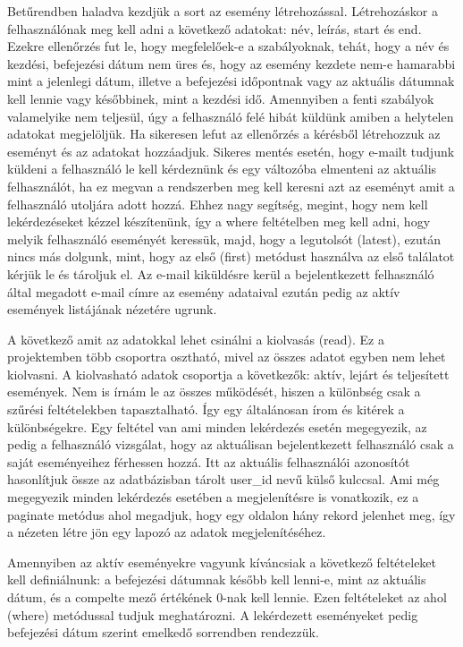 \documentclass[
]{thesis-ekf}
\theoremstyle{definition}
\theoremstyle{remark}
\begin{document}
Betűrendben haladva kezdjük a sort az esemény létrehozással. Létrehozáskor a felhasználónak meg kell adni a következő adatokat: név, leírás, start és end. Ezekre ellenőrzés fut le, hogy megfelelőek-e a szabályoknak, tehát, hogy a név és kezdési, befejezési dátum nem üres és, hogy az esemény kezdete nem-e hamarabbi mint a jelenlegi dátum, illetve a befejezési időpontnak vagy az aktuális dátumnak kell lennie vagy későbbinek, mint a kezdési idő. Amennyiben a fenti szabályok valamelyike nem teljesül, úgy a felhasználó felé hibát küldünk amiben a helytelen adatokat megjelöljük. Ha sikeresen lefut az ellenőrzés a kérésből létrehozzuk az eseményt és az adatokat hozzáadjuk. Sikeres mentés esetén, hogy e-mailt tudjunk küldeni a felhasználó le kell kérdeznünk és egy változóba elmenteni az aktuális felhasználót, ha ez megvan a rendszerben meg kell keresni azt az eseményt amit a felhasználó utoljára adott hozzá. Ehhez nagy segítség, megint, hogy nem kell lekérdezéseket kézzel készítenünk, így a where feltételben meg kell adni, hogy melyik felhasználó eseményét keressük, majd, hogy a legutolsót (latest), ezután nincs más dolgunk, mint, hogy az első (first) metódust használva az első találatot kérjük le és tároljuk el. Az e-mail kiküldésre kerül a bejelentkezett felhasználó által megadott e-mail címre az esemény adataival ezután pedig az aktív események listájának nézetére ugrunk.

A következő amit az adatokkal lehet csinálni a kiolvasás (read). Ez a projektemben több csoportra osztható, mivel az összes adatot egyben nem lehet kiolvasni. A kiolvasható adatok csoportja a következők: aktív, lejárt és teljesített események. Nem is írnám le az összes működését, hiszen a különbség csak a szűrési feltételekben tapasztalható. Így egy általánosan írom és kitérek a különbségekre. Egy feltétel van ami minden lekérdezés esetén megegyezik, az pedig a felhasználó vizsgálat, hogy az aktuálisan bejelentkezett felhasználó csak a saját eseményeihez férhessen hozzá. Itt az aktuális felhasználói azonosítót hasonlítjuk össze az adatbázisban tárolt user\_id nevű külső kulccsal. Ami még megegyezik minden lekérdezés esetében a megjelenítésre is vonatkozik, ez a paginate metódus ahol megadjuk, hogy egy oldalon hány rekord jelenhet meg, így a nézeten létre jön egy lapozó az adatok megjelenítéséhez.

Amennyiben az aktív eseményekre vagyunk kíváncsiak a következő feltételeket kell definiálnunk: a befejezési dátumnak később kell lenni-e, mint az aktuális dátum, és a compelte mező értékének 0-nak kell lennie. Ezen feltételeket az ahol (where) metódussal tudjuk meghatározni. A lekérdezett eseményeket pedig befejezési dátum szerint emelkedő sorrendben rendezzük.
\end{document}
